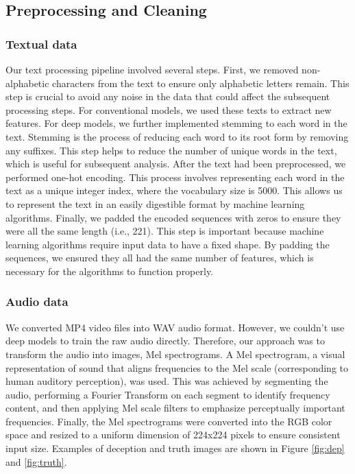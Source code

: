 \documentclass[12pt]{article}
\begin{document}
\subsection{Preprocessing and Cleaning}
\label{sec:pre}
\subsubsection{Textual data}
Our text processing pipeline involved several steps. First, we removed non-alphabetic characters from the text to ensure only alphabetic letters remain. This step is crucial to avoid any noise in the data that could affect the subsequent processing steps. For conventional models, we used these texts to extract new features. For deep models, we further implemented stemming to each word in the text. Stemming is the process of reducing each word to its root form by removing any suffixes. This step helps to reduce the number of unique words in the text, which is useful for subsequent analysis. After the text had been preprocessed, we performed one-hot encoding. This process involves representing each word in the text as a unique integer index, where the vocabulary size is 5000. This allows us to represent the text in an easily digestible format by machine learning algorithms. Finally, we padded the encoded sequences with zeros to ensure they were all the same length (i.e., 221). This step is important because machine learning algorithms require input data to have a fixed shape. By padding the sequences, we ensured they all had the same number of features, which is necessary for the algorithms to function properly. 
\subsubsection{Audio data}
We converted MP4 video files into WAV audio format. However, we couldn't use deep models to train the raw audio directly. Therefore, our approach was to transform the audio into images, Mel spectrograms. A Mel spectrogram, a visual representation of sound that aligns frequencies to the Mel scale (corresponding to human auditory perception), was used. This was achieved by segmenting the audio, performing a Fourier Transform on each segment to identify frequency content, and then applying Mel scale filters to emphasize perceptually important frequencies. Finally, the Mel spectrograms were converted into the RGB color space and resized to a uniform dimension of 224x224 pixels to ensure consistent input size. Examples of deception and truth images are shown in Figure \ref{fig:dep} and \ref{fig:truth}.
\end{document}
